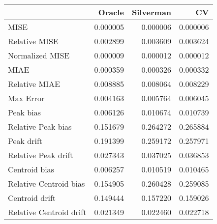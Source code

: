 \begin{tabular}{lrrr}
  \hline
 & Oracle & Silverman & CV \\ 
  \hline
MISE & 0.000005 & 0.000006 & 0.000006 \\ 
  Relative MISE & 0.002899 & 0.003609 & 0.003624 \\ 
  Normalized MISE & 0.000009 & 0.000012 & 0.000012 \\ 
  MIAE & 0.000359 & 0.000326 & 0.000332 \\ 
  Relative MIAE & 0.008885 & 0.008064 & 0.008229 \\ 
  Max Error & 0.004163 & 0.005764 & 0.006045 \\ 
  Peak bias & 0.006126 & 0.010674 & 0.010739 \\ 
  Relative Peak bias & 0.151679 & 0.264272 & 0.265884 \\ 
  Peak drift & 0.191399 & 0.259172 & 0.257971 \\ 
  Relative Peak drift & 0.027343 & 0.037025 & 0.036853 \\ 
  Centroid bias & 0.006257 & 0.010519 & 0.010465 \\ 
  Relative Centroid bias & 0.154905 & 0.260428 & 0.259085 \\ 
  Centroid drift & 0.149444 & 0.157220 & 0.159026 \\ 
  Relative Centroid drift & 0.021349 & 0.022460 & 0.022718 \\ 
   \hline
\end{tabular}
